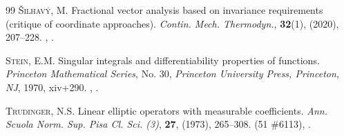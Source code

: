 \documentclass[11pt,hyp,]{nyjm}
\numberwithin{equation}{section}
\theoremstyle{remark}
\begin{document}
\begin{thebibliography}{99}
 {\scshape \v{S}ilhav\'y, M.} Fractional vector analysis based on invariance requirements (critique of coordinate approaches). {\em Contin. Mech. Thermodyn.}, {\bf 32}(1), (2020), 207--228. , .

 {\scshape Stein, E.M.} Singular integrals and differentiability properties of functions. {\em Princeton Mathematical Series}, No. 30, {\em Princeton University Press, Princeton, NJ}, 1970, xiv+290. , .

 {\scshape Trudinger, N.S.} Linear elliptic operators with measurable coefficients. {\em Ann. Scuola Norm. Sup. Pisa Cl. Sci. (3)}, {\bf 27}, (1973), 265--308.  (51 \#6113), .

\end{thebibliography}









			
\end{document}
